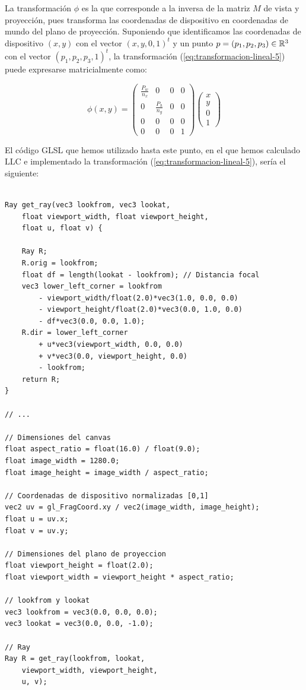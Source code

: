 La transformación $\phi$ es la que corresponde a la inversa de la matriz $M$ de vista y proyección, pues transforma las coordenadas de dispositivo en coordenadas de mundo del plano de proyección. Suponiendo que identificamos las coordenadas de dispositivo $(x,y)$ con el vector $(x,y,0,1)^t$ y un punto $p=(p_1,p_2,p_3)\in\mathbb{R}^3$ con el vector $(p_1,p_2,p_3,1)^t$, la transformación (\ref{eq:transformacion-lineal-5}) puede expresarse matricialmente como:

\begin{equation}
    \label{eq:transformacion-lineal-matrix-3D-base}
    \phi(x,y) = \left(\begin{array}{ccc|c}
        \frac{P_w}{n_x} & 0 & 0 & 0 \\
        0 & \frac{P_h}{n_y} & 0 & 0 \\
        0 & 0 & 0 & 0 \\ \hline
        0 & 0 & 0 & 1
    \end{array}\right)\left(
        \begin{array}{c}
            x \\ y \\ 0 \\ \hline 1
        \end{array}\right)
\end{equation}

El código GLSL que hemos utilizado hasta este punto, en el que hemos calculado $\mathrm{LLC}$ e implementado la transformación (\ref{eq:transformacion-lineal-5}), sería el siguiente:

\begin{lstlisting}

Ray get_ray(vec3 lookfrom, vec3 lookat, 
    float viewport_width, float viewport_height, 
    float u, float v) {
    
    Ray R;
    R.orig = lookfrom;
    float df = length(lookat - lookfrom); // Distancia focal
    vec3 lower_left_corner = lookfrom
        - viewport_width/float(2.0)*vec3(1.0, 0.0, 0.0)
        - viewport_height/float(2.0)*vec3(0.0, 1.0, 0.0) 
        - df*vec3(0.0, 0.0, 1.0);
    R.dir = lower_left_corner 
        + u*vec3(viewport_width, 0.0, 0.0)
        + v*vec3(0.0, viewport_height, 0.0) 
        - lookfrom;
    return R;
}

// ... 

// Dimensiones del canvas
float aspect_ratio = float(16.0) / float(9.0);
float image_width = 1280.0;
float image_height = image_width / aspect_ratio;

// Coordenadas de dispositivo normalizadas [0,1]
vec2 uv = gl_FragCoord.xy / vec2(image_width, image_height); 
float u = uv.x;
float v = uv.y;

// Dimensiones del plano de proyeccion
float viewport_height = float(2.0);
float viewport_width = viewport_height * aspect_ratio;

// lookfrom y lookat
vec3 lookfrom = vec3(0.0, 0.0, 0.0);
vec3 lookat = vec3(0.0, 0.0, -1.0);

// Ray
Ray R = get_ray(lookfrom, lookat, 
    viewport_width, viewport_height, 
    u, v);
\end{lstlisting}

